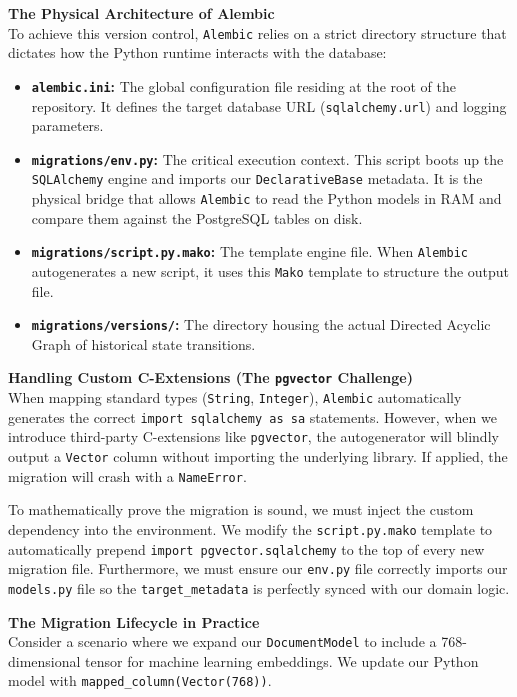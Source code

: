 \textbf{The Physical Architecture of Alembic} \\
To achieve this version control, \texttt{Alembic} relies on a strict directory structure that dictates how the Python runtime interacts with the database:
\begin{itemize}
    \item \textbf{\texttt{alembic.ini}:} The global configuration file residing at the root of the repository. It defines the target database URL (\texttt{sqlalchemy.url}) and logging parameters.
    \item \textbf{\texttt{migrations/env.py}:} The critical execution context. This script boots up the \texttt{SQLAlchemy} engine and imports our \texttt{DeclarativeBase} metadata. It is the physical bridge that allows \texttt{Alembic} to read the Python models in RAM and compare them against the PostgreSQL tables on disk.
    \item \textbf{\texttt{migrations/script.py.mako}:} The template engine file. When \texttt{Alembic} autogenerates a new script, it uses this \texttt{Mako} template to structure the output file.
    \item \textbf{\texttt{migrations/versions/}:} The directory housing the actual Directed Acyclic Graph of historical state transitions.
\end{itemize}

\textbf{Handling Custom C-Extensions (The \texttt{pgvector} Challenge)} \\
When mapping standard types (\texttt{String}, \texttt{Integer}), \texttt{Alembic} automatically generates the correct \texttt{import sqlalchemy as sa} statements. However, when we introduce third-party C-extensions like \texttt{pgvector}, the autogenerator will blindly output a \texttt{Vector} column without importing the underlying library. If applied, the migration will crash with a \texttt{NameError}.

To mathematically prove the migration is sound, we must inject the custom dependency into the environment. We modify the \texttt{script.py.mako} template to automatically prepend \texttt{import pgvector.sqlalchemy} to the top of every new migration file. Furthermore, we must ensure our \texttt{env.py} file correctly imports our \texttt{models.py} file so the \texttt{target\_metadata} is perfectly synced with our domain logic.

\textbf{The Migration Lifecycle in Practice} \\
Consider a scenario where we expand our \texttt{DocumentModel} to include a 768-dimensional tensor for machine learning embeddings. We update our Python model with \texttt{mapped\_column(Vector(768))}.

